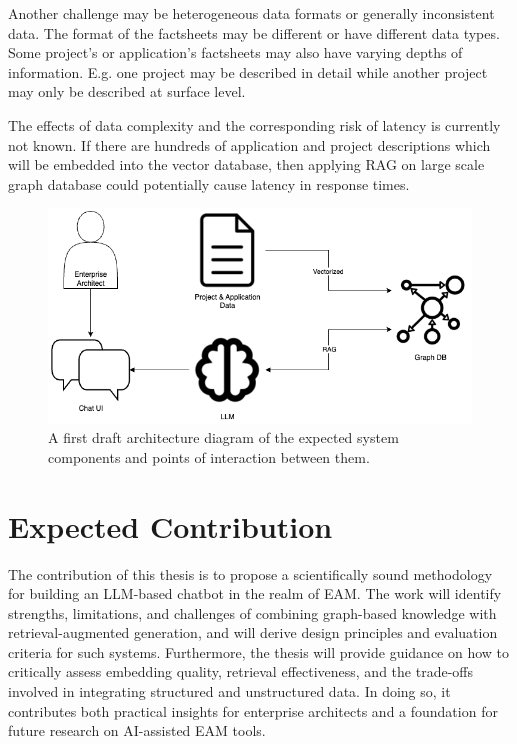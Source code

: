 \documentclass[english]{lni}
\begin{document}
Another challenge may be heterogeneous data formats or generally inconsistent data. The format of the factsheets may be different or have different data types. Some project's or application's factsheets may also have varying depths of information. E.g. one project may be described in detail while another project may only be described at surface level.

The effects of data complexity and the corresponding risk of latency is currently not known. If there are hundreds of application and project descriptions which will be embedded into the vector database, then applying RAG on large scale graph database could potentially cause latency in response times.

\begin{figure}[h]
\centering
\includegraphics[scale=0.5]{./architecture_diagram.png}
\caption{A first draft architecture diagram of the expected system components and points of interaction between them.}
\label{fig:arch_diagram}
\end{figure}

\section{Expected Contribution}
The contribution of this thesis is to propose a scientifically sound methodology for building an LLM-based chatbot in the realm of EAM. The work will identify strengths, limitations, and challenges of combining graph-based knowledge with retrieval-augmented generation, and will derive design principles and evaluation criteria for such systems. Furthermore, the thesis will provide guidance on how to critically assess embedding quality, retrieval effectiveness, and the trade-offs involved in integrating structured and unstructured data. In doing so, it contributes both practical insights for enterprise architects and a foundation for future research on AI-assisted EAM tools.
\end{document}
